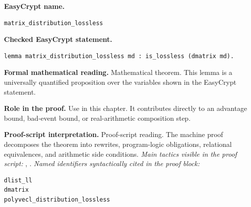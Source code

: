 \begin{formaltheorem}
\noindent\textbf{EasyCrypt name.}
\begin{lstlisting}[language=EasyCrypt,basicstyle=\ttfamily\scriptsize]
matrix_distribution_lossless
\end{lstlisting}
\noindent\textbf{Checked EasyCrypt statement.}
\begin{lstlisting}[language=EasyCrypt,basicstyle=\ttfamily\scriptsize]
lemma matrix_distribution_lossless md : is_lossless (dmatrix md).
\end{lstlisting}
\noindent\textbf{Formal mathematical reading.}
Mathematical theorem. This lemma is a universally quantified proposition over the variables shown in the EasyCrypt statement.

\noindent\textbf{Role in the proof.}
Use in this chapter. It contributes directly to an advantage bound, bad-event bound, or real-arithmetic composition step.

\noindent\textbf{Proof-script interpretation.}
Proof-script reading. The machine proof decomposes the theorem into rewrites, program-logic obligations, relational equivalences, and arithmetic side conditions.
\emph{Main tactics visible in the proof script:} , .
\emph{Named identifiers syntactically cited in the proof block:}
\begin{lstlisting}[language=EasyCrypt,basicstyle=\ttfamily\scriptsize]
dlist_ll
dmatrix
polyvecl_distribution_lossless
\end{lstlisting}

\end{formaltheorem}


